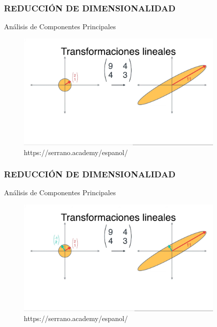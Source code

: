 \documentclass{beamer}
\begin{document}
\begin{frame}
	\frametitle{REDUCCIÓN DE DIMENSIONALIDAD}
	\begin{block}{Análisis de Componentes Principales}	
		\begin{figure}
			\includegraphics[width=0.9\textwidth]{PCA/IMG_3572.jpg}
			\caption{https://serrano.academy/espanol/}
		\end{figure}
	\end{block}
\end{frame}

\begin{frame}
	\frametitle{REDUCCIÓN DE DIMENSIONALIDAD}
	\begin{block}{Análisis de Componentes Principales}	
		\begin{figure}
			\includegraphics[width=0.9\textwidth]{PCA/IMG_3573.jpg}
			\caption{https://serrano.academy/espanol/}
		\end{figure}
	\end{block}
\end{frame}
\end{document}
